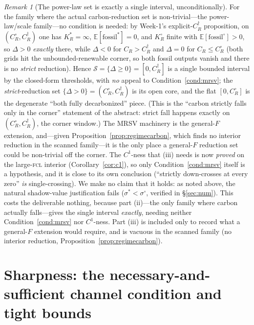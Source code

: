 \documentclass[11pt,reqno]{amsart}
\theoremstyle{plain}
\theoremstyle{definition}
\theoremstyle{remark}
\newtheorem{remark}{Remark}
\newcommand{\KRs}{K_R^{*}}
\newcommand{\KRo}{K_R^{\circ}}
\newcommand{\CR}{C_R}
\newcommand{\E}{\mathbb{E}}
\begin{document}
\begin{remark}[The power-law set is exactly a single interval, unconditionally]
For the family where the actual carbon-reduction set is non-trivial---the
power-law/scale family---no condition is needed: by Week-1's explicit-$\CR^{\dagger}$ proposition,
on $(\CR^{\circ},\CR^{\dagger})$ one has $\KRs=\infty$, $\E[\text{fossil}^{*}]=0$,
and $\KRo$ finite with $\E[\text{fossil}^{\circ}]>0$, so $\Delta>0$ \emph{exactly}
there, while $\Delta<0$ for $\CR>\CR^{\dagger}$ and $\Delta=0$ for
$\CR\le\CR^{\circ}$ (both grids hit the unbounded-renewable corner, so both fossil
outputs vanish and there is no \emph{strict} reduction). Hence
$\mathcal S=\{\Delta\ge0\}=[0,\CR^{\dagger}]$ is a single bounded interval by the
closed-form thresholds, with \emph{no} appeal to Condition~\ref{cond:mrsv}; the
\emph{strict}-reduction set $\{\Delta>0\}=(\CR^{\circ},\CR^{\dagger})$ is its open
core, and the flat $[0,\CR^{\circ}]$ is the degenerate ``both fully decarbonized''
piece. (This is the ``carbon strictly falls only in the corner'' statement of the
abstract: strict fall happens exactly on $(\CR^{\circ},\CR^{\dagger})$, the corner
window.) The MRSV machinery
is the general-$F$ extension, and---given Proposition~\ref{prop:regimecarbon}, which
finds no interior reduction in the scanned family---it is the only place a general-$F$
reduction set could be non-trivial off the corner. The $C^{1}$-ness that (iii)
needs is now \emph{proved} on the large-\textsc{fcl} interior
(Corollary~\ref{cor:c1}), so only Condition~\ref{cond:mrsv} itself is a hypothesis,
and it is close to its own conclusion (``strictly down-crosses at every zero''
\emph{is} single-crossing). We make no claim that it holds: as noted above, the
natural shadow-value justification fails ($\sigma^{*}<\sigma^{\circ}$, verified in
\S\ref{sec:num}). This costs the deliverable nothing, because part (ii)---the only
family where carbon actually falls---gives the single interval \emph{exactly},
needing neither Condition~\ref{cond:mrsv} nor $C^{1}$-ness. Part (iii) is included
only to record what a general-$F$ extension would require, and is vacuous in the
scanned family (no interior reduction, Proposition~\ref{prop:regimecarbon}).
\end{remark}

\section{Sharpness: the necessary-and-sufficient channel condition and tight bounds}\label{sec:sharp}
\end{document}
